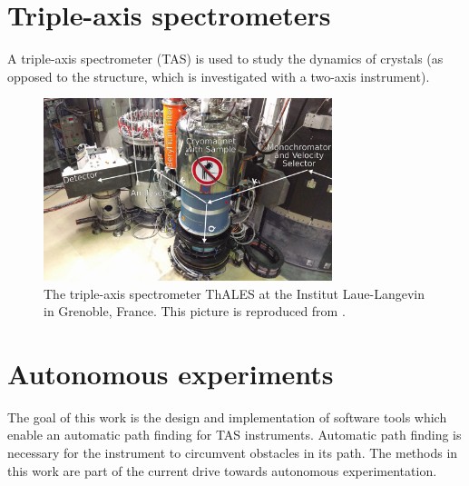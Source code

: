 \section{Triple-axis spectrometers \label{sec:tas}}

A triple-axis spectrometer (TAS) is used to study the dynamics of crystals (as opposed to the structure, which is investigated with a two-axis instrument).



\clearpage
\begin{figure}[htb]
	\centering
	\includegraphics[width=0.75\textwidth]{figures/thales.jpg}
	\caption{The triple-axis spectrometer ThALES \cite{thales} at the Institut Laue-Langevin in Grenoble, France. This picture is reproduced from \cite{TODO}.}
	\label{fig:thales}
\end{figure}



\section{Autonomous experiments \label{sec:autonomous}}

The goal of this work is the design and implementation of software tools which enable an automatic path finding for TAS instruments.
Automatic path finding is necessary for the instrument to circumvent obstacles in its path. The methods in this work are part of the current drive towards autonomous experimentation.
